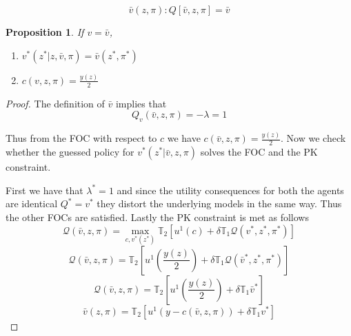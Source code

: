 \documentclass[12pt]{article}
\newtheorem{proposition}{Proposition}
\begin{document}
\[\bar{v}(z,\pi) : Q[\bar{v},z,\pi]=\bar{v}\]
\begin{proposition}
\label{propo-2}
If $v=\bar{v}$, 
\begin{enumerate}
	\item $v^*(z^* |z,\bar{v},\pi) = \bar{v}(z^*,\pi^*)$
	\item $c(v,z,\pi)=\frac{y(z)}{2}$
\end{enumerate}
\end{proposition}
\begin{proof}
The definition of $\bar{v}$ implies that 
\[Q_v(\bar{v},z,\pi)=-\lambda=1\]

Thus from the FOC with respect to $c$ we have $c(\bar{v},z,\pi)=\frac{y(z)}{2}$. Now we check whether the guessed policy for $v^*(z^*|\bar{v},z,\pi)$ solves the FOC and the PK constraint.

\noindent First we have that $\lambda^*=1$ and since the utility consequences for both the agents are identical $Q^*=v^*$ they distort the underlying models in the same way. Thus the other FOCs are satisfied. Lastly the PK constraint is met as follows
\[\mathcal{Q}(\bar{v},z,\pi)=\max_{c,v^*(z^*)} \mathbb{T}_2\left[u^1(c)+\delta \mathbb{T}_1 \mathcal{Q}(v^*,z^*,\pi^*)\right]\]
\[\mathcal{Q}(\bar{v},z,\pi)=\mathbb{T}_2\left[u^1(\frac{y(z)}{2})+\delta \mathbb{T}_1 \mathcal{Q}(\bar{v}^*,z^*,\pi^*)\right]\]
\[\mathcal{Q}(\bar{v},z,\pi)=\mathbb{T}_2\left[u^1(\frac{y(z)}{2})+\delta \mathbb{T}_1 \bar{v}^*\right]\]
\[\bar{v}(z,\pi)=\mathbb{T}_2\left[u^1(y-c(\bar{v},z,\pi))+\delta \mathbb{T}_1 v^*\right]\]
\end{proof}
\end{document}
